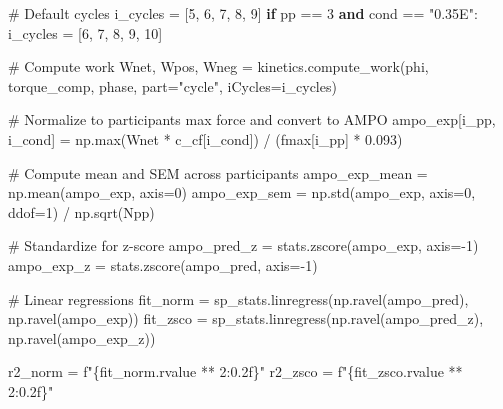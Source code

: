\documentclass[
  11pt,
  a4paper]{article}
\newenvironment{Shaded}{\begin{snugshade}}{\end{snugshade}}
\newcommand{\BuiltInTok}[1]{\textcolor[rgb]{0.00,0.23,0.31}{#1}}
\newcommand{\CommentTok}[1]{\textcolor[rgb]{0.37,0.37,0.37}{#1}}
\newcommand{\ControlFlowTok}[1]{\textcolor[rgb]{0.00,0.23,0.31}{\textbf{#1}}}
\newcommand{\DecValTok}[1]{\textcolor[rgb]{0.68,0.00,0.00}{#1}}
\newcommand{\FloatTok}[1]{\textcolor[rgb]{0.68,0.00,0.00}{#1}}
\newcommand{\KeywordTok}[1]{\textcolor[rgb]{0.00,0.23,0.31}{\textbf{#1}}}
\newcommand{\NormalTok}[1]{\textcolor[rgb]{0.00,0.23,0.31}{#1}}
\newcommand{\OperatorTok}[1]{\textcolor[rgb]{0.37,0.37,0.37}{#1}}
\newcommand{\SpecialCharTok}[1]{\textcolor[rgb]{0.37,0.37,0.37}{#1}}
\newcommand{\SpecialStringTok}[1]{\textcolor[rgb]{0.13,0.47,0.30}{#1}}
\newcommand{\StringTok}[1]{\textcolor[rgb]{0.13,0.47,0.30}{#1}}
\begin{document}
\begin{Shaded}
\begin{Highlighting}[]
        \CommentTok{\# Default cycles}
\NormalTok{        i\_cycles }\OperatorTok{=}\NormalTok{ [}\DecValTok{5}\NormalTok{, }\DecValTok{6}\NormalTok{, }\DecValTok{7}\NormalTok{, }\DecValTok{8}\NormalTok{, }\DecValTok{9}\NormalTok{]}
        \ControlFlowTok{if}\NormalTok{ pp }\OperatorTok{==} \DecValTok{3} \KeywordTok{and}\NormalTok{ cond }\OperatorTok{==} \StringTok{"0.35E"}\NormalTok{:}
\NormalTok{            i\_cycles }\OperatorTok{=}\NormalTok{ [}\DecValTok{6}\NormalTok{, }\DecValTok{7}\NormalTok{, }\DecValTok{8}\NormalTok{, }\DecValTok{9}\NormalTok{, }\DecValTok{10}\NormalTok{]}

        \CommentTok{\# Compute work}
\NormalTok{        Wnet, Wpos, Wneg }\OperatorTok{=}\NormalTok{ kinetics.compute\_work(phi, torque\_comp, phase, part}\OperatorTok{=}\StringTok{"cycle"}\NormalTok{, iCycles}\OperatorTok{=}\NormalTok{i\_cycles)}

        \CommentTok{\# Normalize to participant\textquotesingle{}s max force and convert to AMPO}
\NormalTok{        ampo\_exp[i\_pp, i\_cond] }\OperatorTok{=}\NormalTok{ np.}\BuiltInTok{max}\NormalTok{(Wnet }\OperatorTok{*}\NormalTok{ c\_cf[i\_cond]) }\OperatorTok{/}\NormalTok{ (fmax[i\_pp] }\OperatorTok{*} \FloatTok{0.093}\NormalTok{)}

\CommentTok{\# Compute mean and SEM across participants}
\NormalTok{ampo\_exp\_mean }\OperatorTok{=}\NormalTok{ np.mean(ampo\_exp, axis}\OperatorTok{=}\DecValTok{0}\NormalTok{)}
\NormalTok{ampo\_exp\_sem }\OperatorTok{=}\NormalTok{ np.std(ampo\_exp, axis}\OperatorTok{=}\DecValTok{0}\NormalTok{, ddof}\OperatorTok{=}\DecValTok{1}\NormalTok{) }\OperatorTok{/}\NormalTok{ np.sqrt(Npp)}

\CommentTok{\# Standardize for z{-}score}
\NormalTok{ampo\_pred\_z }\OperatorTok{=}\NormalTok{ stats.zscore(ampo\_exp, axis}\OperatorTok{={-}}\DecValTok{1}\NormalTok{)}
\NormalTok{ampo\_exp\_z }\OperatorTok{=}\NormalTok{ stats.zscore(ampo\_pred, axis}\OperatorTok{={-}}\DecValTok{1}\NormalTok{)}

\CommentTok{\# Linear regressions}
\NormalTok{fit\_norm }\OperatorTok{=}\NormalTok{ sp\_stats.linregress(np.ravel(ampo\_pred), np.ravel(ampo\_exp))}
\NormalTok{fit\_zsco }\OperatorTok{=}\NormalTok{ sp\_stats.linregress(np.ravel(ampo\_pred\_z), np.ravel(ampo\_exp\_z))}

\NormalTok{r2\_norm }\OperatorTok{=} \SpecialStringTok{f"}\SpecialCharTok{\{}\NormalTok{fit\_norm}\SpecialCharTok{.}\NormalTok{rvalue }\OperatorTok{**} \DecValTok{2}\SpecialCharTok{:0.2f\}}\SpecialStringTok{"}
\NormalTok{r2\_zsco }\OperatorTok{=} \SpecialStringTok{f"}\SpecialCharTok{\{}\NormalTok{fit\_zsco}\SpecialCharTok{.}\NormalTok{rvalue }\OperatorTok{**} \DecValTok{2}\SpecialCharTok{:0.2f\}}\SpecialStringTok{"}


\end{Highlighting}
\end{Shaded}
\end{document}
